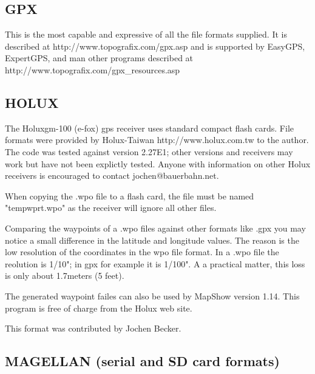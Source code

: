 \documentclass[12pt]{article}
\begin{document}
\subsection{GPX}

	This is the most capable and expressive of all the file formats
	supplied.    It is described at http://www.topografix.com/gpx.asp
	and is supported by EasyGPS, ExpertGPS, and man other programs
	described at http://www.topografix.com/gpx\_resources.asp



\subsection{HOLUX}

        The Holuxgm-100 (e-fox) gps receiver uses standard compact
        flash cards.  File formats were provided by Holux-Taiwan
        http://www.holux.com.tw to the author.  The code was tested
        against version 2.27E1; other versions and receivers may
        work but have not been explictly tested.  Anyone with
        information on other Holux receivers is encouraged to contact
        jochen@bauerbahn.net.

        When copying the .wpo file to a flash card, the file must be
        named "tempwprt.wpo" as the receiver will ignore all other
        files.

        Comparing the waypoints of a .wpo files against other formats
        like .gpx you may notice a small difference in the latitude
        and longitude values.  The reason is the low resolution of
        the coordinates in the wpo file format.  In a .wpo file the
        reolution is 1/10"; in gpx for example it is 1/100".  A a practical
	matter, this loss is only about 1.7meters (5 feet).


        The generated waypoint failes can also be used by MapShow
        version 1.14.  This program is free of charge from the Holux web
        site.

        This format was contributed by Jochen Becker.



\subsection{MAGELLAN (serial and SD card formats)}
\label{MagellanSerial}
\end{document}
